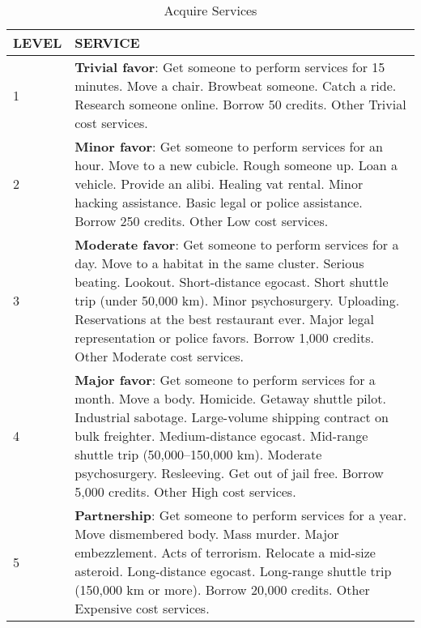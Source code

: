 \begin{table}
\caption{Acquire Services}
\begin{tabularx}{\textwidth}{|l|X|}
\hline
LEVEL & SERVICE \\
\hline
1 & \textbf{Trivial favor}: Get someone to perform services for 15 minutes. Move a chair. Browbeat someone. Catch a ride.  Research someone online. Borrow 50 credits. Other Trivial cost services. \\
\hline
2 & \textbf{Minor favor}: Get someone to perform services for an hour. Move to a new cubicle. Rough someone up. Loan a vehicle. Provide an alibi. Healing vat rental. Minor hacking assistance. Basic legal or police assistance. Borrow 250 credits. Other Low cost services. \\
\hline
3 & \textbf{Moderate favor}: Get someone to perform services for a day. Move to a habitat in the same cluster. Serious beating. Lookout. Short-distance egocast. Short shuttle trip (under 50,000 km). Minor psychosurgery. Uploading.  Reservations at the best restaurant ever. Major legal representation or police favors. Borrow 1,000 credits. Other Moderate cost services. \\
\hline
4 & \textbf{Major favor}: Get someone to perform services for a month. Move a body. Homicide. Getaway shuttle pilot.  Industrial sabotage. Large-volume shipping contract on bulk freighter. Medium-distance egocast. Mid-range shuttle trip (50,000–150,000 km). Moderate psychosurgery.  Resleeving. Get out of jail free. Borrow 5,000 credits. Other High cost services. \\
\hline
5 & \textbf{Partnership}: Get someone to perform services for a year. Move dismembered body. Mass murder. Major embezzlement. Acts of terrorism. Relocate a mid-size asteroid. Long-distance egocast. Long-range shuttle trip (150,000 km or more). Borrow 20,000 credits. Other Expensive cost services. \\
\hline
\end{tabularx}
\end{table}




